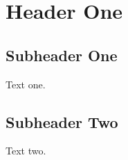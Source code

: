 \documentclass{article}%
\begin{document}
%
\normalsize%
\section{Header One}%
\label{sec:HeaderOne}%

%
\subsection{Subheader One}%
\label{subsec:SubheaderOne}%

%
Text one.%
\subsection{Subheader Two}%
\label{subsec:SubheaderTwo}%

%
Text two.%
\end{document}
